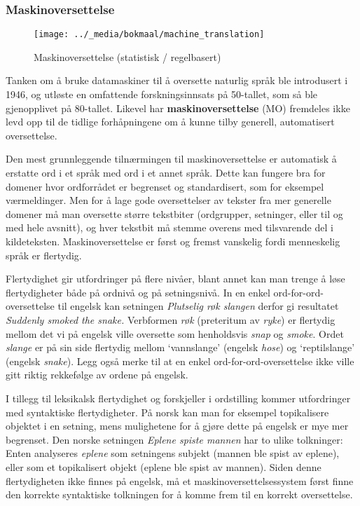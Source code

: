 \begin{multicols}{2}
\subsubsection{Maskinoversettelse}

\begin{figure*}[htb]
  \center
  \texttt{[image: ../\_media/bokmaal/machine\_translation]}
  \caption{Maskinoversettelse (statistisk / regelbasert)}
  \label{fig:mtarch_no}
\end{figure*}

Tanken om å bruke datamaskiner til å oversette naturlig språk ble introdusert i 1946, og utløste en omfattende forskningsinnsats på 50-tallet, som så ble gjenopplivet på 80-tallet. Likevel har \textbf{maskinoversettelse} (MO) fremdeles ikke levd opp til de tidlige forhåpningene om å kunne tilby generell, automatisert oversettelse.


Den mest grunnleggende tilnærmingen til maskinoversettelse er automatisk å erstatte ord i et språk med ord i et annet språk. Dette kan fungere bra for domener hvor ordforrådet er begrenset og standardisert, som for eksempel værmeldinger. Men for å lage gode oversettelser av tekster fra mer generelle domener må man oversette større tekstbiter (ordgrupper, setninger, eller til og med hele avsnitt), og hver tekstbit må stemme overens med tilsvarende del i kildeteksten. Maskinoversettelse er først og fremst vanskelig fordi menneskelig språk er flertydig. 

Flertydighet gir utfordringer på flere nivåer, blant annet kan man trenge å løse flertydigheter både på ordnivå og på setningsnivå. 
In en enkel ord-for-ord-oversettelse til engelsk kan setningen \textit{Plutselig røk slangen} derfor gi resultatet \textit{Suddenly smoked the snake.}
Verbformen \textit{røk} (preteritum av \textit{ryke}) er flertydig mellom det vi på engelsk ville oversette som henholdsvis \textit{snap} og \textit{smoke}.
Ordet \textit{slange} er på sin side flertydig mellom `vannslange' (engelsk \textit{hose}) og `reptilslange' (engelsk \textit{snake}). Legg også merke til at en enkel ord-for-ord-oversettelse ikke ville gitt riktig rekkefølge av ordene på engelsk.

I tillegg til leksikalsk flertydighet og forskjeller i ordstilling kommer utfordringer med syntaktiske flertydigheter. På norsk kan man for eksempel topikalisere objektet i en setning, mens mulighetene for å gjøre dette på engelsk er mye mer begrenset. Den norske setningen \textit{Eplene spiste mannen} har to ulike tolkninger: Enten analyseres \textit{eplene} som setningens subjekt (mannen ble spist av eplene), eller som et topikalisert objekt (eplene ble spist av mannen). Siden denne flertydigheten ikke finnes på engelsk, må et maskinoversettelsessystem først finne den korrekte syntaktiske tolkningen for å komme frem til en korrekt oversettelse.


\end{multicols}
